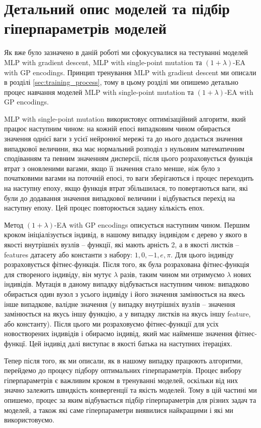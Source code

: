 \section{Детальний опис моделей та підбір гіперпараметрів моделей}

Як вже було зазначено в даній роботі ми сфокусувалися на тестуванні моделей MLP with gradient descent, MLP with single-point mutation та $(1+\lambda)$-EA with GP encodings. Принцип тренування MLP with gradient descent ми описали в розділі \ref{sec:training_process}, тому в цьому розділі ми опишемо детально процес навчання моделей MLP with single-point mutation та $(1+\lambda)$-EA with GP encodings.

MLP with single-point mutation використовує оптимізаційний алгоритм, який працює наступним чином: на кожній епосі випадковим чином обирається значення однієї ваги з усієї нейронної мережі та до нього додається значення випадкової величини, яка має нормальний розподіл з нульовим математичним сподіванням та певним значенням дисперсії, після цього розраховується функція втрат з оновленими вагами, якщо її значення стало менше, ніж було з початковими вагами на поточній епосі, то ваги зберігаються і процес переходить на наступну епоху, якщо функція втрат збільшилася, то повертаються ваги, які були до додавання значення випадкової величини і відбувається перехід на наступну епоху. Цей процес повторюється задану кількість епох.

Метод $(1+\lambda)$-EA with GP encodings описується наступним чином. Першим кроком ініціалізується індивід, в нашому випадку індивідом є дерево у якого в якості внутрішніх вузлів -- функції, які мають арність 2, а в якості листків -- features датасету або константи з набору: $1, 0, -1, e, \pi$. Для цього індивіду розраховується фітнес-функція. Після того, як була розрахована фітнес-функція для створеного індивіду, він мутує $\lambda$ разів, таким чином ми отримуємо $\lambda$ нових індивідів. Мутація в даному випадку відбувається наступним чином: випадково обирається один вузол з усього індивіду і його значення замінюється на якесь інше випадкове, валідне значення (у випадку внутрішніх вузлів -- значення замінюється на якусь іншу функцію, а у випадку листків на якусь іншу feature, або константу).  Після цього ми розраховуємо фітнес-функції для усіх новостворених індивідів і обираємо індивід, який має найменше значення фітнес-функцї. Цей індивід далі виступає в якості батька на наступних ітераціях.

Тепер після того, як ми описали, як в нашому випадку працюють алгоритми, перейдемо до процесу підбору оптимальних гіперпараметрів. Процес вибору гіперпараметрів є важливим кроком в тренуванні моделей, оскільки від них значно залежить швидкість конвергенції та якість моделей. Тому в цій частині ми опишемо, процес за яким відбувається підбір гіперпараметрів для різних задач та моделей, а також які саме гіперпараметри виявилися найкращими і які ми використовуємо.

